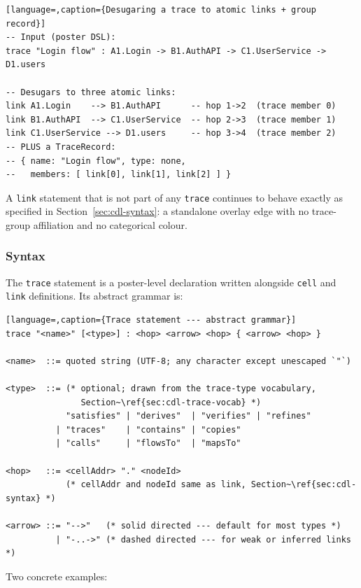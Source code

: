 \begin{lstlisting}[language=,caption={Desugaring a trace to atomic links + group record}]
-- Input (poster DSL):
trace "Login flow" : A1.Login -> B1.AuthAPI -> C1.UserService -> D1.users

-- Desugars to three atomic links:
link A1.Login    --> B1.AuthAPI      -- hop 1->2  (trace member 0)
link B1.AuthAPI  --> C1.UserService  -- hop 2->3  (trace member 1)
link C1.UserService --> D1.users     -- hop 3->4  (trace member 2)
-- PLUS a TraceRecord:
-- { name: "Login flow", type: none,
--   members: [ link[0], link[1], link[2] ] }
\end{lstlisting}

A \texttt{link} statement that is not part of any \texttt{trace} continues to
behave exactly as specified in Section~\ref{sec:cdl-syntax}: a standalone
overlay edge with no trace-group affiliation and no categorical colour.

\subsubsection{Syntax}
\label{sec:cdl-trace-syntax}

The \texttt{trace} statement is a poster-level declaration written alongside
\texttt{cell} and \texttt{link} definitions.  Its abstract grammar is:

\begin{lstlisting}[language=,caption={Trace statement --- abstract grammar}]
trace "<name>" [<type>] : <hop> <arrow> <hop> { <arrow> <hop> }

<name>  ::= quoted string (UTF-8; any character except unescaped `"`)

<type>  ::= (* optional; drawn from the trace-type vocabulary,
               Section~\ref{sec:cdl-trace-vocab} *)
            "satisfies" | "derives"  | "verifies" | "refines"
          | "traces"    | "contains" | "copies"
          | "calls"     | "flowsTo"  | "mapsTo"

<hop>   ::= <cellAddr> "." <nodeId>
            (* cellAddr and nodeId same as link, Section~\ref{sec:cdl-syntax} *)

<arrow> ::= "-->"   (* solid directed --- default for most types *)
          | "-..->" (* dashed directed --- for weak or inferred links *)
\end{lstlisting}

Two concrete examples:

